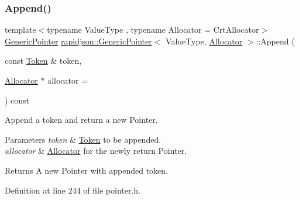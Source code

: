 \subsubsection{\texorpdfstring{Append()}{Append()}\hspace{0.1cm}{\footnotesize\ttfamily [1/2]}}
{\footnotesize\ttfamily template$<$typename Value\+Type , typename Allocator  = Crt\+Allocator$>$ \\
\mbox{\hyperlink{classrapidjson_1_1_generic_pointer}{Generic\+Pointer}} \mbox{\hyperlink{classrapidjson_1_1_generic_pointer}{rapidjson\+::\+Generic\+Pointer}}$<$ Value\+Type, \mbox{\hyperlink{classrapidjson_1_1_allocator}{Allocator}} $>$\+::Append (\begin{DoxyParamCaption}\item[{const \mbox{\hyperlink{structrapidjson_1_1_generic_pointer_1_1_token}{Token}} \&}]{token,  }\item[{\mbox{\hyperlink{classrapidjson_1_1_allocator}{Allocator}} $\ast$}]{allocator = {} }\end{DoxyParamCaption}) const}



Append a token and return a new Pointer. 


\begin{DoxyParams}{Parameters}
{\em token} & \mbox{\hyperlink{structrapidjson_1_1_generic_pointer_1_1_token}{Token}} to be appended. \\
\hline
{\em allocator} & \mbox{\hyperlink{classrapidjson_1_1_allocator}{Allocator}} for the newly return Pointer. \\
\hline
\end{DoxyParams}
\begin{DoxyReturn}{Returns}
A new Pointer with appended token. 
\end{DoxyReturn}


Definition at line 244 of file pointer.\+h.


